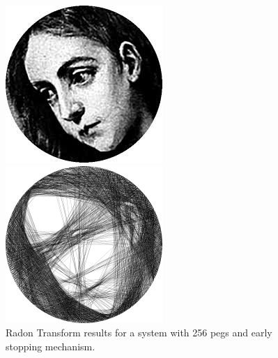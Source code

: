 \begin{figure}[H]
\begin{minipage}{0.2\linewidth}
    \end{minipage}
    \begin{minipage}{0.2\linewidth}
        \centering
        \includegraphics[width=\linewidth]{images/radon/mary.png}
    \end{minipage}
    \begin{minipage}{0.2\linewidth}
        \centering
        \includegraphics[width=\linewidth]{images/radon/mary_radon.png}
    \end{minipage}
    \caption{Radon Transform results for a system with 256 pegs and early stopping mechanism.}
    \label{fig:radon_output}
\end{figure}


